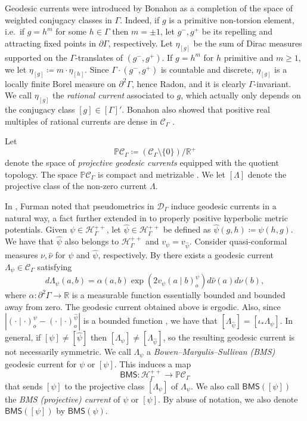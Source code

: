 \documentclass[twoside]{amsart}
\theoremstyle{definition}
\numberwithin{equation}{section}
\numberwithin{theorem}{section}
\newcommand{\msf}[1]{\mathsf{#1}}
\newcommand{\bbP}{\mathbb{P}}
\newcommand{\R}{\mathbb{R}}
\newcommand{\calC}{\mathcal{C}}
\newcommand{\calD}{\mathcal{D}}
\newcommand{\calH}{\mathcal{H}}
\newcommand{\Hc}{{\mathcal H}}
\newcommand{\scrH}{\mathscr{H}}
\newcommand{\G}{\Gamma}
\newcommand{\Lam}{\Lambda}
\newcommand{\p}{\psi}
\newcommand{\gpr}[2]{(#1 \mid#2)}
\newcommand{\ra}{\rightarrow}
\newcommand{\BMS}{\msf{BMS}}
\newcommand{\ppG}{\partial^2 \G}
\begin{document}
Geodesic currents were introduced by Bonahon \cite{bonahon.annals,bonahon.currentshpygroups} as a completion of the space of weighted conjugacy classes in $\G$. Indeed, if $g$ is a primitive non-torsion element, i.e.\ if $g=h^m$ for some $h\in \G$ then $m=\pm1$, let $g^-,g^+$ be its repelling and attracting fixed points
in $\partial \G$, respectively. Let $\eta_{[g]}$ be the sum of Dirac measures
supported on the $\G$-translates of $(g^-,g^+)$. If $g=h^m$ for $h$ primitive and $m\geq 1$, we let $\eta_{[g]} \coloneqq m \cdot \eta_{[h]}$.
Since $\G \cdot (g^-,g^+)$ is countable and discrete, $\eta_{[g]}$ is a locally finite Borel measure on $\partial^2\G$, hence Radon,
and it is clearly $\G$-invariant.
We call $\eta_{[g]}$ the \emph{rational current} associated to $g$, which actually only depends on the conjugacy class $[g]\in [\G]'$. Bonahon also showed that positive real multiples of rational currents
are dense in $\calC_\G$ \cite[Theorem~7]{bonahon.currentshpygroups}. 

Let
\[
\mathbb{P}\calC_\G \coloneqq (\calC_\G \setminus \{0\})/\mathbb{R}^+
\]
denote the space of \emph{projective geodesic currents} equipped
with the quotient topology. The space $\mathbb{P}\calC_\G$
is compact and metrizable \cite{bonahon.annals}.  We let $[\Lam]$ denote the projective class of the non-zero current $\Lam$.



In \cite{furman}, Furman noted that pseudometrics in $\calD_\G$ induce geodesic currents in a natural way, a fact further extended in \cite[Section~3.3]{CRS} to properly positive hyperbolic metric potentials. 
Given $\psi \in \Hc^{++}_\G$, let $\hat{\psi} \in \Hc^{++}_\G$ be defined as $\hat{\psi}(g,h) \coloneqq \psi(h,g)$. We have that $\hat\p$ also belongs to $\calH_\G^{++}$ and $v_\psi=v_{\hat{\psi}}$. Consider quasi-conformal measures $\nu, \hat{\nu}$ for $\psi$ and $\hat{\psi}$, respectively. By \cite[Equation~3.9]{CRS} there exists a geodesic current $\Lambda_\psi \in \calC_\G$ satisfying
\[
d\Lambda_\psi(a,b) = \alpha(a,b)\exp(2v_\psi\gpr{a}{b}^\psi_o)d\hat{\nu}(a)d\nu(b),
\]
where $\alpha:\ppG\ra \R$ is a measurable function essentially bounded and bounded away from zero. The geodesic current obtained above is ergodic. Also, since $|\gpr{\cdot}{\cdot}_o^\p-\gpr{\cdot}{\cdot}_o^{\hat\p}|$ is a bounded function \cite[Lemma~3.10]{CRS}, we have that $[\Lam_{\hat{\psi}}]=[\iota_*\Lambda_\psi]$. In general, if $[\psi] \neq [\hat{\psi}]$ then $[\Lambda_\psi] \neq [\Lambda_{\hat{\psi}}]$, so the resulting geodesic current is not necessarily symmetric. We call $\Lam_\p$ a \emph{Bowen--Margulis--Sullivan (BMS)} geodesic current for $\p$ or $[\p]$.
This induces a map \[\BMS:\scrH^{++}_\G \ra \bbP\calC_\G\] that sends $[\psi]$ to the projective class $[\Lam_\psi]$ of $\Lam_\psi$. We also call $\BMS([\p])$ the \emph{BMS (projective) current} of $\p$ or $[\p]$. By abuse of notation, we also denote $\BMS([\p])$ by $\BMS(\p)$.
\end{document}
